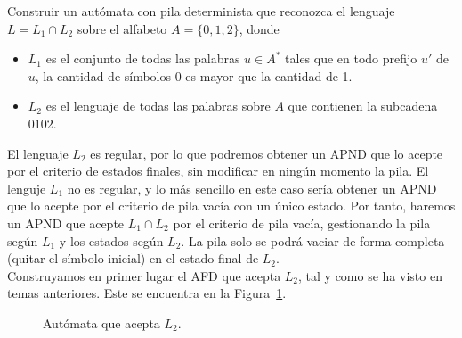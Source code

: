 \begin{ejercicio}\label{ej:1.5.15}
    Construir un autómata con pila determinista que reconozca el lenguaje $L=L_1\cap L_2$ sobre el alfabeto $A = \{0,1,2\}$, donde
    \begin{itemize}
        \item $L_1$ es el conjunto de todas las palabras $u\in A^\ast$ tales que en todo prefijo $u'$ de $u$, la cantidad de símbolos 0 es mayor que la cantidad de 1.
        \item $L_2$ es el lenguaje de todas las palabras sobre $A$ que contienen la subcadena $0102$.
    \end{itemize}

    El lenguaje $L_2$ es regular, por lo que podremos obtener un APND que lo acepte por el criterio de estados finales, sin modificar en ningún momento la pila. El lenguje $L_1$ no es regular, y lo más sencillo en este caso sería obtener un APND que lo acepte por el criterio de pila vacía con un único estado. Por tanto, haremos un APND que acepte $L_1\cap L_2$ por el criterio de pila vacía, gestionando la pila según $L_1$ y los estados según $L_2$. La pila solo se podrá vaciar de forma completa (quitar el símbolo inicial) en el estado final de $L_2$.\\

    Construyamos en primer lugar el AFD que acepta $L_2$, tal y como se ha visto en temas anteriores. Este se encuentra en la Figura~\ref{fig:1.5.15-1}.
    \begin{figure}
        \centering
        \caption{Autómata que acepta $L_2$.}
        \label{fig:1.5.15-1}
    \end{figure}


\end{ejercicio}
